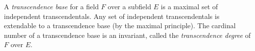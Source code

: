 A \emph{transcendence base} for a field $F$ over a subfield $E$ is a maximal set of independent transcendentals. Any set of independent transcendentals is extendable to a transcendence base (by the maximal principle). The cardinal number of a transcendence base is an invariant, called the \emph{transcendence degree} of $F$ over $E$.